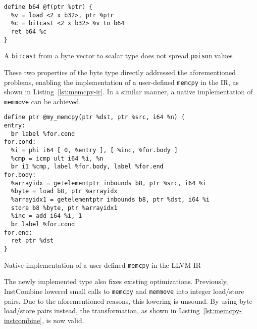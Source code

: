 \documentclass[a4paper,12pt]{article}
\begin{document}
\begin{listing}[h]
  \begin{verbatim}
define b64 @f(ptr %ptr) {
  %v = load <2 x b32>, ptr %ptr
  %c = bitcast <2 x b32> %v to b64
  ret b64 %c
}
  \end{verbatim}
  \caption{A \texttt{bitcast} from a byte vector to scalar type does not spread \texttt{poison} values}
  \label{lst:bitcast-poison-byte}
\end{listing}

These two properties of the byte type directly addressed the aforementioned problems,  enabling the implementation of a user-defined \texttt{memcpy} in the IR, as shown in Listing~\ref{lst:memcpy-ir}.
In a similar manner, a native implementation of \texttt{memmove} can be achieved.

\begin{listing}[H]
  \begin{verbatim}
define ptr @my_memcpy(ptr %dst, ptr %src, i64 %n) {
entry:
  br label %for.cond
for.cond:
  %i = phi i64 [ 0, %entry ], [ %inc, %for.body ]
  %cmp = icmp ult i64 %i, %n
  br i1 %cmp, label %for.body, label %for.end
for.body:
  %arrayidx = getelementptr inbounds b8, ptr %src, i64 %i
  %byte = load b8, ptr %arrayidx
  %arrayidx1 = getelementptr inbounds b8, ptr %dst, i64 %i
  store b8 %byte, ptr %arrayidx1
  %inc = add i64 %i, 1
  br label %for.cond
for.end:
  ret ptr %dst
}
  \end{verbatim}
  \caption{Native implementation of a user-defined \texttt{memcpy} in the LLVM IR}
  \label{lst:memcpy-ir}
\end{listing}

The newly implemented type also fixes existing optimizations.
Previously, InstCombine lowered small calls to \texttt{memcpy} and \texttt{memmove} into integer load/store pairs.
Due to the aforementioned reasons, this lowering is unsound.
By using byte load/store pairs instead, the transformation, as shown in Listing~\ref{lst:memcpy-instcombine}, is now valid.
\end{document}
